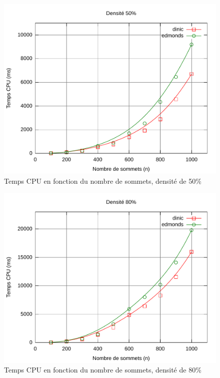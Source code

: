 \begin{figure}[h!]
\begin{center}
\includegraphics[width=\textwidth]{files/c50}
\end{center}
\caption{Temps CPU en fonction du nombre de sommets, densité de 50\%}
\end{figure}

\begin{figure}[h!]
\begin{center}
\includegraphics[width=\textwidth]{files/c80}
\end{center}
\caption{Temps CPU en fonction du nombre de sommets, densité de 80\%}
\end{figure}

